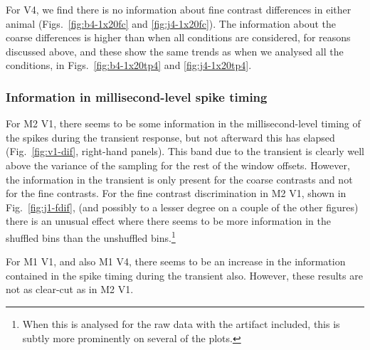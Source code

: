For V4, we find there is no information about fine contrast differences in either animal (Figs.~\ref{fig:b4-1x20fc} and \ref{fig:j4-1x20fc}). The information about the coarse differences is higher than when all conditions are considered, for reasons discussed above, and these show the same trends as when we analysed all the conditions, in Figs.~\ref{fig:b4-1x20tp4} and \ref{fig:j4-1x20tp4}.

\FloatBarrier
\subsubsection{Information in millisecond-level spike timing}

For M2 V1, there seems to be some information in the millisecond-level timing of the spikes during the transient response, but not afterward this has elapsed (Fig.~\ref{fig:v1-dif}, right-hand panels). This band due to the transient is clearly well above the variance of the sampling for the rest of the window offsets.
However, the information in the transient is only present for the coarse contrasts and not for the fine contrasts.
For the fine contrast discrimination in M2 V1, shown in Fig.~\ref{fig:j1-fdif}, (and possibly to a lesser degree on a couple of the other figures) there is an unusual effect where there seems to be more information in the shuffled bins than the unshuffled bins.\footnote{When this is analysed for the raw data with the artifact included, this is subtly more prominently on several of the plots.}

For M1 V1, and also M1 V4, there seems to be an increase in the information contained in the spike timing during the transient also. However, these results are not as clear-cut as in M2 V1.

% 

